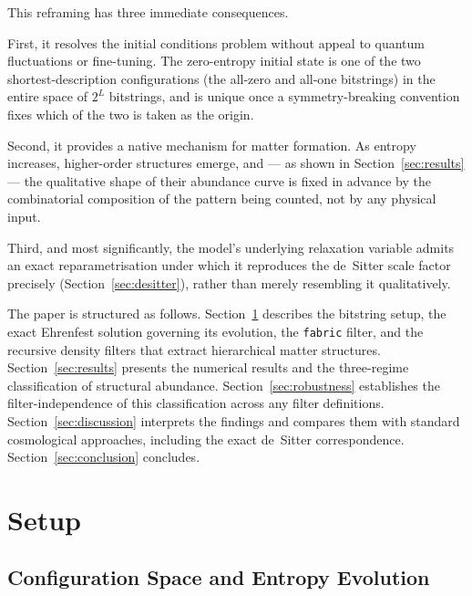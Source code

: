 \documentclass[11pt]{article}
\begin{document}
This reframing has three immediate consequences.

First, it resolves the initial conditions problem without appeal to quantum fluctuations or fine-tuning.
The zero-entropy initial state is one of the two shortest-description configurations
(the all-zero and all-one bitstrings) in the entire space of $2^L$ bitstrings, and is unique once a
symmetry-breaking convention fixes which of the two is taken as the origin.

Second, it provides a native mechanism for matter formation.
As entropy increases, higher-order structures emerge, and --- as shown in
Section~\ref{sec:results} --- the qualitative shape of their abundance curve is fixed in advance by the
combinatorial composition of the pattern being counted, not by any physical input.

Third, and most significantly, the model's underlying relaxation variable admits an exact reparametrisation
under which it reproduces the de~Sitter scale factor precisely (Section~\ref{sec:desitter}), rather than
merely resembling it qualitatively.

The paper is structured as follows. Section~\ref{sec:setup} describes the bitstring setup,
the exact Ehrenfest solution governing its evolution, the \texttt{fabric} filter, and the recursive density
filters that extract hierarchical matter structures.
Section~\ref{sec:results} presents the numerical results and the three-regime classification of structural abundance.
Section~\ref{sec:robustness} establishes the filter-independence of this classification across any filter definitions.
Section~\ref{sec:discussion} interprets the findings and compares them with standard cosmological approaches,
including the exact de~Sitter correspondence.
Section~\ref{sec:conclusion} concludes.


\section{Setup}
\label{sec:setup}

\subsection{Configuration Space and Entropy Evolution}
\end{document}
